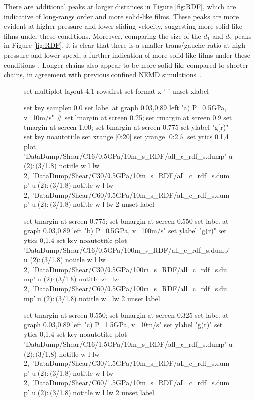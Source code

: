 \documentclass[5p]{elsarticle}
\begin{document}
There are additional peaks at larger distances in Figure \ref{fig:RDF}, which are indicative of long-range order and more solid-like films. These peaks are more evident at higher pressure and lower sliding velocity, suggesting more solid-like films under these conditions. Moreover, comparing the size of the $d_1$ and $d_2$ peaks in Figure \ref{fig:RDF}, it is clear that there is a smaller trans/gauche ratio at high pressure and lower speed, a further indication of more solid-like films under these conditions~\cite{Kavitha2007}. Longer chains also appear to be more solid-like compared to shorter chains, in agreement with previous confined NEMD simulations~\cite{Sivebaek2012}.

\begin{figure}[htp]
    	\begin{center}
		\begin{gnuplot}[terminal=epslatex, terminaloptions={size \SERFigwidth cm, \SERFigheight cm color solid}]
			set multiplot layout 4,1 rowsfirst
			set format x ' '
			unset xlabel

			set key samplen  0.0
			set label at graph 0.03,0.89 left "a) P=0.5GPa, v=10m/s"
#			set lmargin at screen 0.25; set rmargin at screen 0.9
			set tmargin at screen 1.00; set bmargin at screen 0.775
			set ylabel "g(r)"
			set key noautotitle
			set xrange [0:20]
			set yrange [0:2.5]
			set ytics 0,1,4
			plot  	'DataDump/Shear/C16/0.5GPa/10m_s_RDF/all_c_rdf_s.dump' u  ($2):($3/1.8) notitle   w l lw 2,\
		        	'DataDump/Shear/C30/0.5GPa/10m_s_RDF/all_c_rdf_s.dump' u  ($2):($3/1.8) notitle   w l lw 2,\
		        	'DataDump/Shear/C60/0.5GPa/10m_s_RDF/all_c_rdf_s.dump' u  ($2):($3/1.8) notitle   w l lw 2
	    	unset label


			set tmargin at screen 0.775; set bmargin at screen 0.550
			set label at graph 0.03,0.89 left "b) P=0.5GPa, v=100m/s"
			set ylabel "g(r)"
			set ytics 0,1,4
			set key noautotitle
			plot  	'DataDump/Shear/C16/0.5GPa/100m_s_RDF/all_c_rdf_s.dump' u  ($2):($3/1.8) notitle w l lw 2,\
		        	'DataDump/Shear/C30/0.5GPa/100m_s_RDF/all_c_rdf_s.dump' u  ($2):($3/1.8) notitle   w l lw 2,\
		        	'DataDump/Shear/C60/0.5GPa/100m_s_RDF/all_c_rdf_s.dump' u  ($2):($3/1.8) notitle  w l lw 2
	    	unset label



			set tmargin at screen 0.550; set bmargin at screen 0.325
			set label at graph 0.03,0.89 left "c) P=1.5GPa, v=10m/s"
			set ylabel "g(r)"
			set ytics 0,1,4
			set key noautotitle
			plot  	'DataDump/Shear/C16/1.5GPa/10m_s_RDF/all_c_rdf_s.dump' u  ($2):($3/1.8) notitle   w l lw 2,\
		        	'DataDump/Shear/C30/1.5GPa/10m_s_RDF/all_c_rdf_s.dump' u  ($2):($3/1.8) notitle   w l lw 2,\
		        	'DataDump/Shear/C60/1.5GPa/10m_s_RDF/all_c_rdf_s.dump' u  ($2):($3/1.8) notitle   w l lw 2
	    	unset label


\end{gnuplot}
\end{center}
\end{figure}
\end{document}
